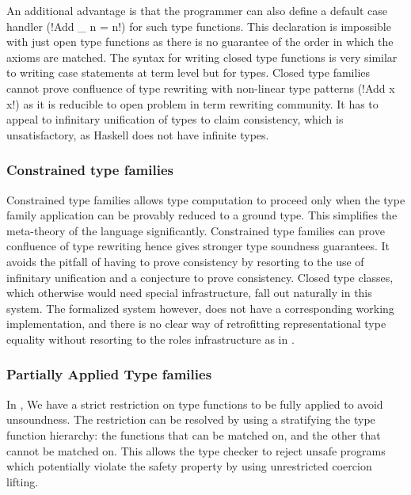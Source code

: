 \documentclass[screen,nonacm]{acmart}
\begin{document}
An additional advantage is that the programmer can also define a default case handler (!Add _ n = n!) for such type functions. This declaration is impossible with just open type functions as there is no guarantee of the order in which the axioms are matched. The syntax for writing closed type functions is very similar to writing case statements at term level but for types. Closed type families cannot prove confluence of type rewriting with non-linear type patterns (!Add x x!) as it is reducible to open problem in term rewriting community\cite{mizuhito_rta_1995}. It has to appeal to infinitary unification\cite{jaffar_efficient_1984} of types to claim consistency, which is unsatisfactory, as Haskell does not have infinite types.

\subsubsection{Constrained type families}
Constrained type families\cite{morris_typefamilies_2017} allows type computation to proceed only when the type family application can be provably reduced to a ground type. This simplifies the meta-theory of the language significantly. Constrained type families can prove confluence of type rewriting hence gives stronger type soundness guarantees. It avoids the pitfall of having to prove consistency by resorting to the use of infinitary unification and a conjecture to prove consistency. Closed type classes, which otherwise would need special infrastructure, fall out naturally in this system. The formalized system however, does not have a corresponding  working implementation, and there is no clear way of retrofitting representational type equality without resorting to the roles infrastructure as in \SFR.

\subsubsection{Partially Applied Type families}
In \SFC, We have a strict restriction on type functions to be fully applied to avoid unsoundness. The restriction can be resolved by using a stratifying the type function hierarchy\cite{kiss_higher-order_2019}: the functions that can be matched on, and the other that cannot be matched on. This allows the type checker to reject unsafe programs which potentially violate the safety property by using unrestricted coercion lifting.
\end{document}
